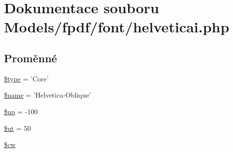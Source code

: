 \hypertarget{helveticai_8php}{\section{Dokumentace souboru Models/fpdf/font/helveticai.php}
\label{helveticai_8php}
}
\subsection*{Proměnné}
\begin{DoxyCompactItemize}
\item 
\hyperlink{helveticai_8php_a9a4a6fba2208984cabb3afacadf33919}{\$type} = 'Core'
\item 
\hyperlink{helveticai_8php_ab2fc40d43824ea3e1ce5d86dee0d763b}{\$name} = 'Helvetica-\/Oblique'
\item 
\hyperlink{helveticai_8php_a6b5ad2ac55f9df46e8f34e78fbd6f176}{\$up} = -\/100
\item 
\hyperlink{helveticai_8php_aadd3f841051043ee58e587e840e8dd0b}{\$ut} = 50
\item 
\hyperlink{helveticai_8php_ac2951b03dbb0317e6c61ec920b7479dc}{\$cw}
\end{DoxyCompactItemize}


